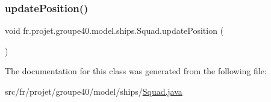\subsubsection{\texorpdfstring{update\+Position()}{updatePosition()}}
{\footnotesize\ttfamily void fr.\+projet.\+groupe40.\+model.\+ships.\+Squad.\+update\+Position (\begin{DoxyParamCaption}{ }\end{DoxyParamCaption})}



The documentation for this class was generated from the following file\+:\begin{DoxyCompactItemize}
\item 
src/fr/projet/groupe40/model/ships/\hyperlink{_squad_8java}{Squad.\+java}\end{DoxyCompactItemize}
